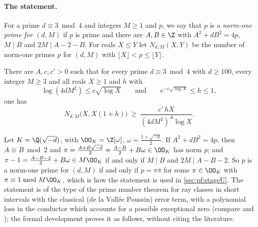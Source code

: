 \paragraph{The statement.}
For a prime $d\equiv3\bmod4$ and integers $M\ge1$ and $p$, we say that $p$ is a \emph{norm-one prime for $(d,M)$} if $p$ is prime and there are
$A,B\in\Z$ with $A^2+dB^2=4p$, $M\mid B$ and $2M\mid A-2-B$. For reals $X\le Y$ let $N_{d,M}(X,Y)$ be the number of norm-one primes $p$ for
$(d,M)$ with $\lfloor X\rfloor<p\le\lfloor Y\rfloor$.

\begin{theorem}\label{pf:sh-misc:shortnorm}
There are $A,c,c'>0$ such that for every prime $d\equiv3\bmod4$ with $d\ge100$, every integer $M\ge3$ and all reals $X\ge1$ and $h$ with
\[
\log(4dM^2)\le c\sqrt{\log X}\qquad\text{and}\qquad e^{-c\sqrt{\log X}}\le h\le1,
\]
one has
\[
N_{d,M}\bigl(X,X(1+h)\bigr)\ \ge\ \frac{c'\,hX}{(4dM^2)^A\log X}.
\]
\end{theorem}

\begin{remark}\label{pf:sh-misc:shortnormrem}
Let $K=\Q(\sqrt{-d})$, with $\OO_K=\Z[\omega]$, $\omega=\frac{1+\sqrt{-d}}2$. If $A^2+dB^2=4p$, then $A\equiv B\bmod2$ and $\pi=\frac{A+B\sqrt{-d}}2=
\frac{A-B}2+B\omega\in\OO_K$ has norm $p$; and $\pi-1=\frac{A-B-2}2+B\omega\in M\OO_K$ if and only if $M\mid B$ and $2M\mid A-B-2$. So $p$ is a
norm-one prime for $(d,M)$ if and only if $p=\pi\bar\pi$ for some $\pi\in\OO_K$ with $\pi\equiv1\bmod M\OO_K$, which is how the statement is
used in \cref{sec:pf:stageU}. The statement is of the type of the prime number theorem for ray classes in short intervals with the
classical (de la Vall\'ee Poussin) error term, with a polynomial loss in the conductor which accounts for a possible exceptional zero
(compare \cite[Ch.~5]{IwaniecKowalski2004} and \cite{Hecke1920}); the formal development proves it as follows, without citing
the literature.
\end{remark}

